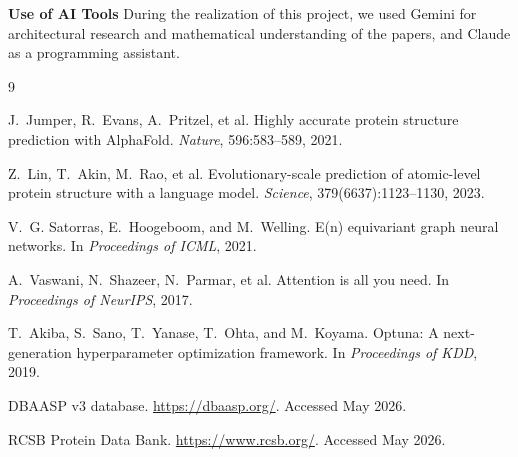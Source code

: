 \documentclass{article}
\begin{document}
\textbf{Use of AI Tools}
During the realization of this project, we used Gemini for architectural research and mathematical understanding of the papers, and Claude as a programming assistant.

\begin{thebibliography}{9}

J.~Jumper, R.~Evans, A.~Pritzel, et al.
\newblock Highly accurate protein structure prediction with AlphaFold.
\newblock \emph{Nature}, 596:583--589, 2021.

Z.~Lin, T.~Akin, M.~Rao, et al.
\newblock Evolutionary-scale prediction of atomic-level protein structure with a language model.
\newblock \emph{Science}, 379(6637):1123--1130, 2023.

V.~G. Satorras, E.~Hoogeboom, and M.~Welling.
\newblock E(n) equivariant graph neural networks.
\newblock In \emph{Proceedings of ICML}, 2021.

A.~Vaswani, N.~Shazeer, N.~Parmar, et al.
\newblock Attention is all you need.
\newblock In \emph{Proceedings of NeurIPS}, 2017.

T.~Akiba, S.~Sano, T.~Yanase, T.~Ohta, and M.~Koyama.
\newblock Optuna: A next-generation hyperparameter optimization framework.
\newblock In \emph{Proceedings of KDD}, 2019.

DBAASP v3 database.
\newblock \url{https://dbaasp.org/}.
\newblock Accessed May 2026.

RCSB Protein Data Bank.
\newblock \url{https://www.rcsb.org/}.
\newblock Accessed May 2026.

\end{thebibliography}
\end{document}
